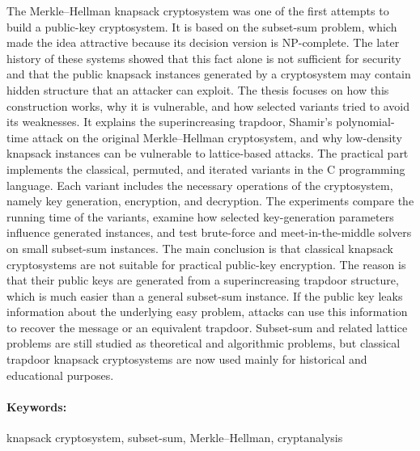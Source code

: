 \documentclass[12pt, twoside]{book}
\begin{document}
The Merkle--Hellman knapsack cryptosystem was one of the first attempts to
build a public-key cryptosystem. It is based on the subset-sum problem, which
made the idea attractive because its decision version is NP-complete. The later
history of these systems showed that this fact alone is not sufficient for
security and that the public knapsack instances generated by a cryptosystem may
contain hidden structure that an attacker can exploit. The thesis focuses on
how this construction works, why it is vulnerable, and how selected variants
tried to avoid its weaknesses. It explains the superincreasing trapdoor,
Shamir's polynomial-time attack on the original Merkle--Hellman cryptosystem,
and why low-density knapsack instances can be vulnerable to lattice-based
attacks. The practical part implements the classical, permuted, and iterated
variants in the C programming language. Each variant includes the necessary
operations of the cryptosystem, namely key generation, encryption, and
decryption. The experiments compare the running time of the variants, examine
how selected key-generation parameters influence generated instances, and test
brute-force and meet-in-the-middle solvers on small subset-sum instances. The
main conclusion is that classical knapsack cryptosystems are not suitable for
practical public-key encryption. The reason is that their public keys are
generated from a superincreasing trapdoor structure, which is much easier than
a general subset-sum instance. If the public key leaks information about the
underlying easy problem, attacks can use this information to recover the
message or an equivalent trapdoor. Subset-sum and related lattice problems are
still studied as theoretical and algorithmic problems, but classical trapdoor
knapsack cryptosystems are now used mainly for historical and educational
purposes.

\paragraph*{Keywords:} knapsack cryptosystem, subset-sum, Merkle--Hellman, cryptanalysis


%
%
%
%
\end{document}
